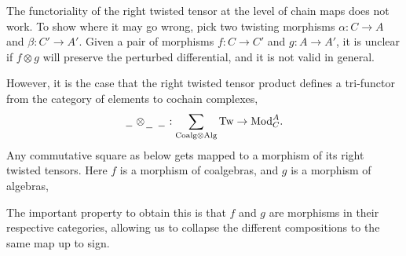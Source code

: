\documentclass[../thesis.tex]{subfiles}
\begin{document}
            \begin{remark}
                The functoriality of the right twisted tensor at the level of chain maps does not work. To show where it may go wrong, pick two twisting morphisms $\alpha: C \rightarrow A$ and $\beta: C' \rightarrow A'$. Given a pair of morphisms $f: C \rightarrow C'$ and $g: A \rightarrow A'$, it is unclear if $f\otimes g$ will preserve the perturbed differential, and it is not valid in general.

                However, it is the case that the right twisted tensor product defines a tri-functor from the category of elements to cochain complexes,
                \begin{align*}
                    \hspace{0.05cm}\underline{\hspace{0.2cm}}\hspace{0.05cm}\otimes_{\hspace{0.05cm}\underline{\hspace{0.2cm}}\hspace{0.05cm}}\hspace{0.05cm}\underline{\hspace{0.2cm}}\hspace{0.05cm} : \sum_{\text{Coalg}\otimes\text{Alg}}\text{Tw} \rightarrow \text{Mod}_C^A\text{.}
                \end{align*}
                Any commutative square as below gets mapped to a morphism of its right twisted tensors. Here $f$ is a morphism of coalgebras, and $g$ is a morphism of algebras,
                \begin{center}
                    \quad\rightsquigarrow\quad
                \end{center}
                The important property to obtain this is that $f$ and $g$ are morphisms in their respective categories, allowing us to collapse the different compositions to the same map up to sign.
            \end{remark}

\end{document}
